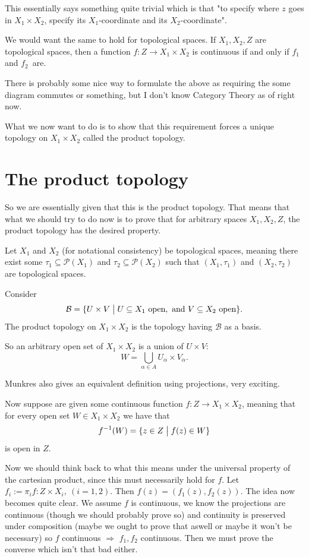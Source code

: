This essentially says something quite trivial which is that 
"to specify where $z$ goes in $X_1 \times X_2$, specify its 
$X_1$-coordinate and its $X_2$-coordinate". 

We would want the same to hold for topological spaces. 
If $X_1,X_2, Z$ are topological spaces, then a function 
$f : Z \to X_1 \times X_2$ is continuous if and only if 
$f_1$ and $f_2$ are. 

There is probably some nice way to formulate the above 
as requiring the some diagram commutes or something, but I 
don't know Category Theory as of right now. 

What we now want to do is to show that this requirement forces 
a unique topology on $X_1\times X_2$ called the product topology. 

\section*{The product topology}
So we are essentially given that this is the product topology. 
That means that what we should try to do now is to prove that 
for arbitrary spaces $X_1,X_2,Z$, the product topology has the 
desired property. 

\begin{defn*}
    Let $X_1$ and $X_2$ (for notational consistency) be topological  
    spaces, meaning there exist some $\tau_1 \subseteq \mathcal P(X_1)$
    and $\tau_2 \subseteq \mathcal P(X_2)$ such that 
    $(X_1,\tau_1)$ and $(X_2, \tau_2)$ are topological spaces. 

    Consider 
    \[
        \mathcal B 
        = \{U \times V \bigm| U \subseteq X_1 \ \text{open}, \ 
        \text{and} \ V \subseteq X_2 \ \text{open}\}.
    \]
    The product topology on $X_1 \times X_2$ is the 
    topology having $\mathcal B$ as a basis. 

    So an arbitrary open set of $X_1\times X_2$ is a union 
    of $U\times V$: 
    \[
        W = \bigcup_{\alpha \in A} U_\alpha \times V_\alpha. 
    \]
\end{defn*}
Munkres also gives an equivalent definition using projections, 
very exciting. 

Now suppose are given some continuous function 
$f : Z \to X_1 \times X_2$, meaning that 
for every open set $W \in X_1 \times X_2$ we have that 
\[
f^{-1}(W) = \{z \in Z \bigm| f(z) \in W\}
\]
is open in $Z$. 

Now we should think back to what this means under the universal 
property of the cartesian product, since this must necessarily 
hold for $f$.  
Let $f_i := \pi_if : Z \times X_i, \ (i = 1,2)$. Then 
$f(z) = (f_1(z), f_2(z))$. The idea now becomes quite clear. 
We assume $f$ is continuous, we know the projections are continuous 
(though we should probably prove so) and continuity is preserved 
under composition (maybe we ought to prove that aswell or maybe 
it won't be necessary) so 
$f$ continuous $\Rightarrow$ $f_1,f_2$ continuous. Then we must prove 
the converse which isn't that bad either. 

